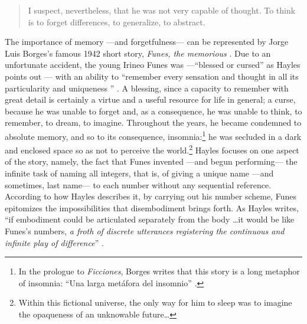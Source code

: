 
% 






\begin{quote}
	I suspect, nevertheless, that he was not very capable of thought. To think is to forget differences, to generalize, to abstract. \parencite[2]{Bor42:Fun}
\end{quote} %

The importance of memory ---and forgetfulness--- can be represented by Jorge Luis Borges's famous 1942 short story, \textit{Funes, the memorious} \parencite{Bor42:Fun}. Due to an unfortunate accident, the young Irineo Funes was ---``blessed or cursed'' as Hayles points out \parencite[156]{Hay93:The}--- with an ability to ``remember every sensation and thought in all its particularity and uniqueness '' \parencite{Hay93:The}. A blessing, since a capacity to remember with great detail is certainly a virtue and a useful resource for life in general; a curse, because he was unable to forget and, as a consequence, he was unable to think, to remember, to dream, to imagine. Throughout the years, he became condemned to absolute memory, and so to its consequence, insomnia:\footnote{In the prologue to \textit{Ficciones}, Borges writes that this story is a long metaphor of insomnia: ``Una larga metáfora del insomnio'' \parencite{Ovi19:Mem}.} he was secluded in a dark and enclosed space so as not to perceive the world.\footnote{Within this fictional universe, the only way for him to sleep was to imagine the opaqueness of an unknowable future\dots} Hayles focuses on one aspect of the story, namely, the fact that Funes invented ---and begun performing--- the infinite task of naming all integers, that is, of giving a unique name ---and sometimes, last name--- to each number without any sequential reference. According to how Hayles describes it, by carrying out his number scheme, Funes epitomizes the impossibilities that disembodiment brings forth. As Hayles writes, ``if embodiment could be articulated separately from the body \dots it would be like Funes's numbers, \textit{a froth of discrete utterances registering the continuous and infinite play of difference}'' \im \parencite[156-159]{Hay93:The}.

